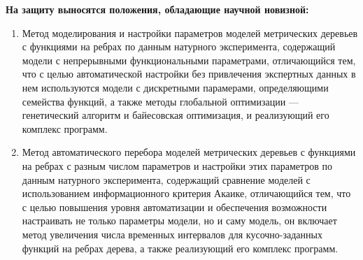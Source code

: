 \textbf{На защиту выносятся положения, обладающие научной новизной:}
\begin{enumerate}[label={\arabic*.}]
    \item Метод моделирования и настройки параметров  моделей метрических деревьев с функциями на ребрах по данным натурного эксперимента, содержащий модели с непрерывными функциональными параметрами, отличающийся тем, что с целью автоматической настройки без привлечения экспертных данных в нем используются модели с дискретными парамерами, определяющими семейства функций, а также методы глобальной оптимизации --- генетический алгоритм и байесовская оптимизация, и реализующий его комплекс программ.
    \item Метод автоматического перебора моделей метрических деревьев с функциями на ребрах с разным числом параметров и настройки этих параметров по данным натурного эксперимента, содержащий сравнение моделей с использованием информационного критерия Акаике, отличающийся тем, что с целью повышения уровня автоматизации  и обеспечения возможности настраивать не только параметры модели, но и саму модель, он включает метод увеличения числа временных интервалов для кусочно-заданных функций на ребрах дерева, а также реализующий его комплекс программ.\\
\end{enumerate}

